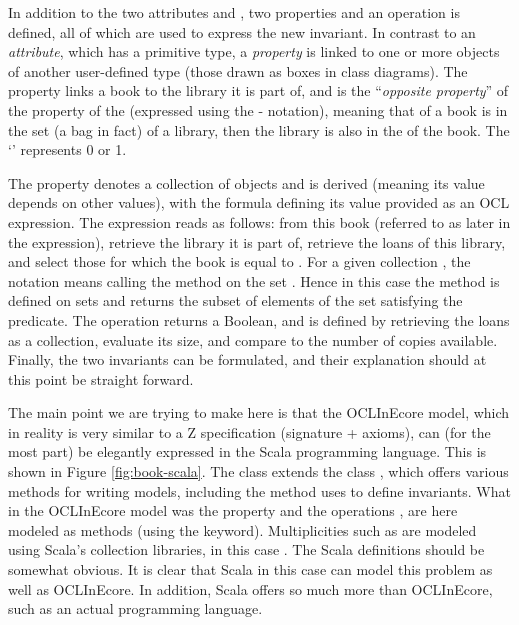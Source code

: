 In addition to the two attributes  and ,
two properties and an operation is defined, all of which are used 
to express the new invariant. In contrast to an {\em attribute}, 
which has a primitive type, a {\em property} is linked to one or 
more objects of another user-defined 
type (those drawn as boxes in class diagrams).
The property  links a book to the library it is part 
of, and is the ``{\em opposite property}'' of the  
property of the  (expressed using the \iocl{#}-
notation), meaning that of a book is in the  set (a 
bag in fact) of a library, then the library is also in the 
 of the book. The `' represents 0 or 1.

The property  denotes a collection of  
objects and is 
derived (meaning its value depends on other values), with the 
formula defining 
its value provided as an OCL expression.
The expression reads as follows: from this book (referred to as 
 later in the expression), retrieve the library it is 
part of, retrieve the 
loans of this library, and select those for which the book is 
equal to . For a given collection , the 
notation  means calling the method  on the 
set . Hence in this case the
 method is defined on sets and returns the 
subset of elements of the set satisfying the predicate.
The operation  returns a Boolean, and is defined 
by retrieving the loans as a collection, evaluate its size, and 
compare to the 
number of copies available. Finally, the two invariants can be 
formulated, and their explanation should at this point be straight 
forward.

The main point we are trying to make here is that the OCLInEcore 
model, which in reality is very similar to a Z specification 
(signature + axioms), can (for the most part) be elegantly 
expressed in the Scala programming language. This is shown in 
Figure \ref{fig:book-scala}. The class  extends the
class , which offers various methods for writing 
models, including the  method uses to define 
invariants. What in the OCLInEcore model was the property 
 and the operations , are here 
modeled as methods (using the  keyword). 
Multiplicities such as  are modeled using Scala's 
collection libraries, in this case . The Scala 
definitions should be somewhat obvious. It is clear that Scala in 
this case can model this problem as well as OCLInEcore. In 
addition, Scala offers so much more than OCLInEcore, such as an 
actual programming language.

